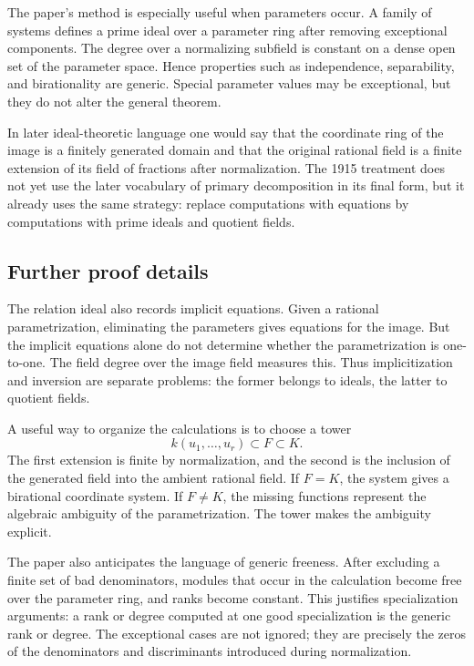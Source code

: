 \documentclass[11pt]{article}
\begin{document}
The paper's method is especially useful when parameters occur. A family of systems defines a prime
ideal over a parameter ring after removing exceptional components. The degree over a normalizing
subfield is constant on a dense open set of the parameter space. Hence properties such as
independence, separability, and birationality are generic. Special parameter values may be
exceptional, but they do not alter the general theorem.

In later ideal-theoretic language one would say that the coordinate ring of the image is a finitely
generated domain and that the original rational field is a finite extension of its field of
fractions after normalization. The 1915 treatment does not yet use the later vocabulary of primary
decomposition in its final form, but it already uses the same strategy: replace computations with
equations by computations with prime ideals and quotient fields.


\subsection{Further proof details}

The relation ideal also records implicit equations. Given a rational parametrization, eliminating
the parameters gives equations for the image. But the implicit equations alone do not determine
whether the parametrization is one-to-one. The field degree over the image field measures this. Thus
implicitization and inversion are separate problems: the former belongs to ideals, the latter to
quotient fields.

A useful way to organize the calculations is to choose a tower \[   k(u_1, \ldots,u_r)\subset
F\subset K. \] The first extension is finite by normalization, and the second is the inclusion of
the generated field into the ambient rational field. If \(F=K\), the system gives a birational
coordinate system. If \(F\neq K\), the missing functions represent the algebraic ambiguity of the
parametrization. The tower makes the ambiguity explicit.

The paper also anticipates the language of generic freeness. After excluding a finite set of bad
denominators, modules that occur in the calculation become free over the parameter ring, and ranks
become constant. This justifies specialization arguments: a rank or degree computed at one good
specialization is the generic rank or degree. The exceptional cases are not ignored; they are
precisely the zeros of the denominators and discriminants introduced during normalization.
\end{document}
